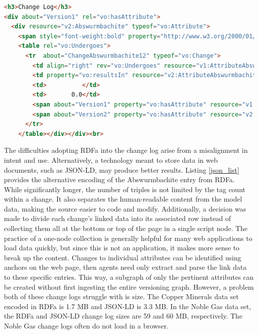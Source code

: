 \begin{lstlisting}[language=HTML, caption=Abswurmbachite RDFa, label=rdfa_list]
<h3>Change Log</h3>
<div about="Version1" rel="vo:hasAttribute">
  <div resource="v2:Abswurmbachite" typeof="vo:Attribute">
    <span style="font-weight:bold" property="http://www.w3.org/2000/01/rdf-schema#label">Abswurmbachite</span>
    <table rel="vo:Undergoes">
      <tr  about="ChangeAbswurmbachite12" typeof="vo:Change">
        <td align="right" rev="vo:Undergoes" resource="v1:AttributeAbswurmbachite12v1" typeof="vo:Attribute"> 9</td>
        <td property="vo:resultsIn" resource="v2:AttributeAbswurmbachite12v2" typeof="vo:Attribute">(12)</td>
        <td>          </td>
        <td>       0.0</td>
        <span about="Version1" property="vo:hasAttribute" resource="v1:AttributeAbswurmbachite12v1"></span>
        <span about="Version2" property="vo:hasAttribute" resource="v2:AttributeAbswurmbachite12v2"></span>
      </tr>
    </table></div></div><br>
\end{lstlisting}

The difficulties adopting RDFa into the change log arise from a misalignment in intent and use.
Alternatively, a technology meant to store data in web documents, such as JSON-LD, may produce better results.
Listing \ref{json_list} provides the alternative encoding of the Abswurmbachite entry from RDFa.
While significantly longer, the number of triples is not limited by the tag count within a change.
It also separates the human-readable content from the model data, making the source easier to code and modify.
Additionally, a decision was made to divide each change's linked data into its associated row instead of collecting them all at the bottom or top of the page in a single script node.
The practice of a one-node collection is generally helpful for many web applications to load data quickly, but since this is not an application, it makes more sense to break up the content.
Changes to individual attributes can be identified using anchors on the web page, then agents need only extract and parse the link data to these specific entries.
This way, a subgraph of only the pertinent attributes can be created without first ingesting the entire versioning graph.
However, a problem both of these change logs struggle with is size.
The Copper Minerals data set encoded in RDFa is 1.7 MB and JSON-LD is 3.3 MB.
In the Noble Gas data set, the RDFa and JSON-LD change log sizes are 59 and 60 MB, respectively.
The Noble Gas change logs often do not load in a browser.

